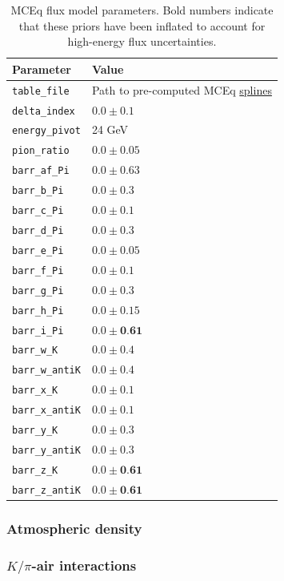 \begin{table}
\caption{MCEq flux model parameters. Bold numbers indicate that these priors have been inflated to account for high-energy flux uncertainties.}
\label{table:mceq_cfg_params}
\begin{center}
\begin{tabular}{ |l|l| } 
\hline

\textbf{Parameter} & \textbf{Value} \\ \hline

\texttt{table\_file} & Path to pre-computed MCEq \href{https://github.com/IceCubeOpenSource/fridge/tree/master/analysis/common/data/flux}{splines} \\ \hline
\texttt{delta\_index} & $0.0 \pm 0.1$ \\ \hline
\texttt{energy\_pivot} & 24 GeV \\ \hline

\texttt{pion\_ratio} & $0.0 \pm 0.05$ \\ \hline
\texttt{barr\_af\_Pi} & $0.0 \pm 0.63$ \\ \hline
\texttt{barr\_b\_Pi} & $0.0 \pm 0.3$ \\ \hline
\texttt{barr\_c\_Pi} & $0.0 \pm 0.1$ \\ \hline
\texttt{barr\_d\_Pi} & $0.0 \pm 0.3$ \\ \hline
\texttt{barr\_e\_Pi} & $0.0 \pm 0.05$ \\ \hline
\texttt{barr\_f\_Pi} & $0.0 \pm 0.1$ \\ \hline
\texttt{barr\_g\_Pi} & $0.0 \pm 0.3$ \\ \hline
\texttt{barr\_h\_Pi} & $0.0 \pm 0.15$ \\ \hline
\texttt{barr\_i\_Pi} & $0.0 \pm \textbf{0.61}$ \\ \hline

\texttt{barr\_w\_K} &  $0.0 \pm 0.4$ \\ \hline
\texttt{barr\_w\_antiK} &  $0.0 \pm 0.4$ \\ \hline
\texttt{barr\_x\_K} &  $0.0 \pm 0.1$ \\ \hline
\texttt{barr\_x\_antiK} &  $0.0 \pm 0.1$ \\ \hline
\texttt{barr\_y\_K} &  $0.0 \pm 0.3$ \\ \hline
\texttt{barr\_y\_antiK} &  $0.0 \pm 0.3$ \\ \hline
\texttt{barr\_z\_K} &  $0.0 \pm \textbf{0.61}$ \\ \hline
\texttt{barr\_z\_antiK} &  $0.0 \pm \textbf{0.61}$ \\ \hline

\end{tabular}
\end{center}
\end{table}

\subsubsection{Atmospheric density}

\subsubsection{$K/\pi$-air interactions}

